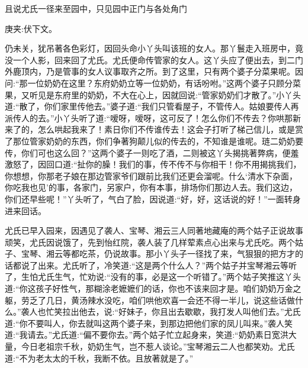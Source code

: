 \begin{parag}
    且说尤氏一径来至园中，只见园中正门与各处角门\begin{note}庚夹:伏下文。\end{note}仍未关，犹吊著各色彩灯，因回头命小丫头叫该班的女人。那丫鬟走入班房中，竟没一个人影，回来回了尤氏。尤氏便命传管家的女人。这丫头应了便出去，到二门外鹿顶内，乃是管事的女人议事取齐之所。到了这里，只有两个婆子分菜果呢。因问:“那一位奶奶在这里？东府奶奶立等一位奶奶，有话吩咐。”这两个婆子只顾分菜果，又听见是东府里的奶奶，不大在心上，因就回说:“管家奶奶们才散了。”小丫头道:“散了，你们家里传他去。”婆子道:“我们只管看屋子，不管传人。姑娘要传人再派传人的去。”小丫头听了道:“嗳呀，嗳呀，这可反了！怎么你们不传去？你哄那新来了的，怎么哄起我来了！素日你们不传谁传去！这会子打听了梯己信儿，或是赏了那位管家奶奶的东西，你们争著狗颠儿似的传去的，不知谁是谁呢。琏二奶奶要传，你们可也这么回？”这两个婆子一则吃了酒，二则被这丫头揭挑著弊病，便羞激怒了，因回口道:“扯你的臊！我们的事，传不传不与你相干！你不用揭挑我们，你想想，你那老子娘在那边管家爷们跟前比我们还更会溜呢。什么‘清水下杂面，你吃我也见’的事，各家门，另家户，你有本事，排场你们那边人去。我们这边，你们还早些呢！”丫头听了，气白了脸，因说道:“好，好，这话说的好！”一面转身进来回话。
\end{parag}


\begin{parag}
    尤氏已早入园来，因遇见了袭人、宝琴、湘云三人同著地藏庵的两个姑子正说故事顽笑，尤氏因说饿了，先到怡红院，袭人装了几样荤素点心出来与尤氏吃。两个姑子、宝琴、湘云等都吃茶，仍说故事。那小丫头子一径找了来，气狠狠的把方才的话都说了出来。尤氏听了，冷笑道:“这是两个什么人？”两个姑子并宝琴湘云等听了，生怕尤氏生气，忙劝说:“没有的事，必是这一个听错了。”两个姑子笑推这丫头道:“你这孩子好性气，那糊涂老嬷嬷们的话，你也不该来回才是。咱们奶奶万金之躯，劳乏了几日，黄汤辣水没吃，咱们哄他欢喜一会还不得一半儿，说这些话做什么。”袭人也忙笑拉出他去，说:“好妹子，你且出去歇歇，我打发人叫他们去。”尤氏道:“你不要叫人，你去就叫这两个婆子来，到那边把他们家的凤儿叫来。”袭人笑道:“我请去。”尤氏道:“偏不要你去。”两个姑子忙立起身来，笑道:“奶奶素日宽洪大量，今日老祖宗千秋，奶奶生气，岂不惹人谈论。”宝琴湘云二人也都笑劝。尤氏道:“不为老太太的千秋，我断不依。且放著就是了。”
\end{parag}


